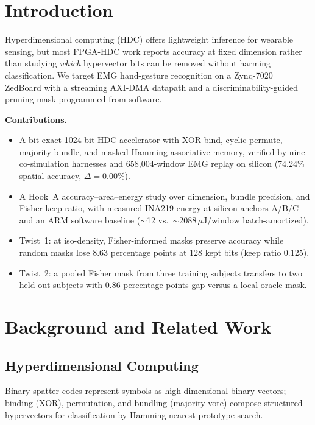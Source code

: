 \documentclass[conference]{IEEEtran}
\begin{document}
\section{Introduction}
\label{sec:intro}


Hyperdimensional computing (HDC) offers lightweight inference for wearable sensing,
but most FPGA-HDC work reports accuracy at fixed dimension rather than studying
\emph{which} hypervector bits can be removed without harming classification.
We target EMG hand-gesture recognition on a Zynq-7020 ZedBoard with a streaming
AXI-DMA datapath and a discriminability-guided pruning mask programmed from software.

\textbf{Contributions.}
\begin{itemize}
\item A bit-exact 1024-bit HDC accelerator with XOR bind, cyclic permute, majority
bundle, and masked Hamming associative memory, verified by nine co-simulation harnesses
and 658{,}004-window EMG replay on silicon (74.24\% spatial accuracy, $\Delta=0.00\%$).
\item A Hook~A accuracy--area--energy study over dimension, bundle precision, and
Fisher keep ratio, with measured INA219 energy at silicon anchors A/B/C and an ARM
software baseline ($\sim$12 vs.\ $\sim$2088\,$\mu$J/window batch-amortized).
\item Twist~1: at iso-density, Fisher-informed masks preserve accuracy while random
masks lose 8.63 percentage points at 128 kept bits (keep ratio 0.125).
\item Twist~2: a pooled Fisher mask from three training subjects transfers to two
held-out subjects with 0.86 percentage points gap versus a local oracle mask.
\end{itemize}

\section{Background and Related Work}
\label{sec:related}


\subsection{Hyperdimensional Computing}
Binary spatter codes represent symbols as high-dimensional binary vectors; binding
(XOR), permutation, and bundling (majority vote) compose structured hypervectors for
classification by Hamming nearest-prototype search.
\end{document}
